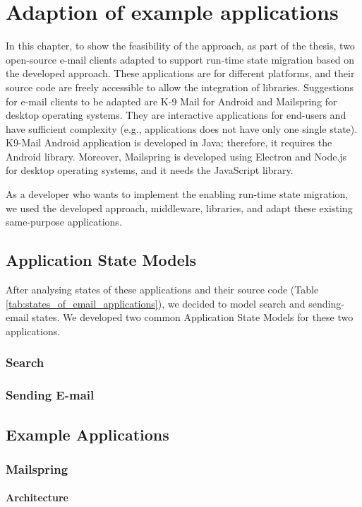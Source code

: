 \chapter{Adaption of example applications}
\label{ch:adaption}
In this chapter, to show the feasibility of the approach, as part of the thesis, two open-source e-mail clients adapted to support run-time state migration based on the developed approach. These applications are for different platforms, and their source code are freely accessible to allow the integration of libraries. 
Suggestions for e-mail clients to be adapted are K-9 Mail for Android and Mailspring for desktop operating systems. They are interactive applications for end-users and have sufficient complexity (e.g., applications does not have only one single state).
K9-Mail Android application is developed in Java; therefore, it requires the Android library. Moreover, Mailspring is developed using Electron and Node.js for desktop operating systems, and it needs the JavaScript library.

As a developer who wants to implement the enabling run-time state migration, we used the developed approach, middleware, libraries, and adapt these existing same-purpose applications. 

\section{Application State Models}
After analysing states of these applications and their source code (Table \ref{tab:states_of_email_applications}), we decided to model search and sending-email states. We developed two common Application State Models for these two applications. 
\subsection{Search}
\subsection{Sending E-mail}

\section{Example Applications}

\subsection{Mailspring}
\subsubsection{Architecture}
